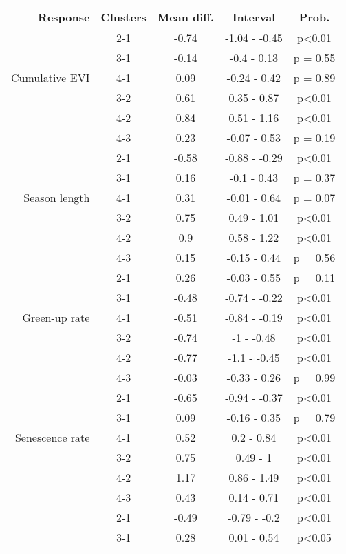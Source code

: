 \begin{table}[H]
\centering
\begin{tabular}{rcccc}
  \hline
Response & Clusters & Mean diff. & Interval & Prob. \\ 
  \hline
 & 2-1 & -0.74 & -1.04 - -0.45 & p<0.01 \\ 
   & 3-1 & -0.14 & -0.4 - 0.13 & p = 0.55 \\ 
  Cumulative EVI & 4-1 &  0.09 & -0.24 - 0.42 & p = 0.89 \\ 
   & 3-2 &  0.61 & 0.35 - 0.87 & p<0.01 \\ 
   & 4-2 &  0.84 & 0.51 - 1.16 & p<0.01 \\ 
   & 4-3 &  0.23 & -0.07 - 0.53 & p = 0.19 \\ 
   \hline
 & 2-1 & -0.58 & -0.88 - -0.29 & p<0.01 \\ 
   & 3-1 &  0.16 & -0.1 - 0.43 & p = 0.37 \\ 
  Season length & 4-1 &  0.31 & -0.01 - 0.64 & p = 0.07 \\ 
   & 3-2 &  0.75 & 0.49 - 1.01 & p<0.01 \\ 
   & 4-2 &   0.9 & 0.58 - 1.22 & p<0.01 \\ 
   & 4-3 &  0.15 & -0.15 - 0.44 & p = 0.56 \\ 
   \hline
 & 2-1 &  0.26 & -0.03 - 0.55 & p = 0.11 \\ 
   & 3-1 & -0.48 & -0.74 - -0.22 & p<0.01 \\ 
  Green-up rate & 4-1 & -0.51 & -0.84 - -0.19 & p<0.01 \\ 
   & 3-2 & -0.74 & -1 - -0.48 & p<0.01 \\ 
   & 4-2 & -0.77 & -1.1 - -0.45 & p<0.01 \\ 
   & 4-3 & -0.03 & -0.33 - 0.26 & p = 0.99 \\ 
   \hline
 & 2-1 & -0.65 & -0.94 - -0.37 & p<0.01 \\ 
   & 3-1 &  0.09 & -0.16 - 0.35 & p = 0.79 \\ 
  Senescence rate & 4-1 &  0.52 & 0.2 - 0.84 & p<0.01 \\ 
   & 3-2 &  0.75 & 0.49 - 1 & p<0.01 \\ 
   & 4-2 &  1.17 & 0.86 - 1.49 & p<0.01 \\ 
   & 4-3 &  0.43 & 0.14 - 0.71 & p<0.01 \\ 
   \hline
 & 2-1 & -0.49 & -0.79 - -0.2 & p<0.01 \\ 
   & 3-1 &  0.28 & 0.01 - 0.54 & p<0.05 \\ 

\end{tabular}
\end{table}
